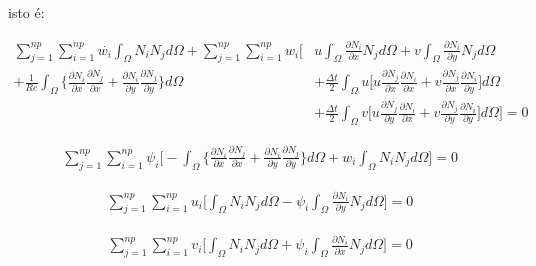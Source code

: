 \noindent
isto é:

\begin{equation} \label{vorticity pre matrix}
 \begin{aligned} 
  \sum\limits_{j=1}^{np} 
  \sum\limits_{i=1}^{np} \overset{.}{w_i} \int_{\Omega} N_i N_j d\Omega 
  + \sum\limits_{j=1}^{np} 
    \sum\limits_{i=1}^{np} w_i \Bigg[
  & u \int_{\Omega}  \frac{\partial N_i}{\partial x} N_j d\Omega 
  + v \int_{\Omega} \frac{\partial N_i}{\partial y} N_j d\Omega
  \\[5pt]
  + \frac{1}{\textit{Re}} \int_{\Omega} \Bigg\{ 
                    \frac{\partial N_i}{\partial x} 
                    \frac{\partial N_j}{\partial x} 
  +                 \frac{\partial N_i}{\partial y} 
                    \frac{\partial N_j}{\partial y} 
  \Bigg\} d\Omega 
 & + \frac{\Delta t}{2} \int_{\Omega} u
 \Bigg[
   u \frac{\partial N_j}{\partial x} \frac{\partial N_i}{\partial x}
 + v \frac{\partial N_j}{\partial x} \frac{\partial N_i}{\partial y}
 \Bigg] d\Omega
 \\[5pt]
 & + \frac{\Delta t}{2} \int_{\Omega} v
 \Bigg[
   u \frac{\partial N_j}{\partial y} \frac{\partial N_i}{\partial x}
 + v \frac{\partial N_j}{\partial y} \frac{\partial N_i}{\partial y}
 \Bigg] d\Omega
  \Bigg] = 0
 \end{aligned}
\end{equation}

\begin{equation}
 \begin{aligned}
  \sum\limits_{j=1}^{np}
  \sum\limits_{i=1}^{np} \psi_i \Bigg[
  - \int_{\Omega} \Bigg\{ 
                  \frac{\partial N_i}{\partial x} 
                  \frac{\partial N_j}{\partial x} 
  +               \frac{\partial N_i}{\partial y} 
                  \frac{\partial N_j}{\partial y} 
  \Bigg\} d\Omega
  + w_i \int_{\Omega} N_i N_j d\Omega
  \Bigg] = 0
 \end{aligned}
\end{equation}

\begin{equation}
 \begin{aligned}
  \sum\limits_{j=1}^{np}
  \sum\limits_{i=1}^{np} u_i \Bigg[
   \int_{\Omega} N_i N_j d\Omega
 - \psi_i \int_{\Omega} \frac{\partial N_i}{\partial y} N_j d\Omega
  \Bigg] = 0
 \end{aligned}
\end{equation}

\begin{equation}
 \begin{aligned}
  \sum\limits_{j=1}^{np}
  \sum\limits_{i=1}^{np} v_i \Bigg[
   \int_{\Omega} N_i N_j d\Omega
 + \psi_i \int_{\Omega} \frac{\partial N_i}{\partial x} N_j d\Omega
  \Bigg] = 0
 \end{aligned}
\end{equation}

